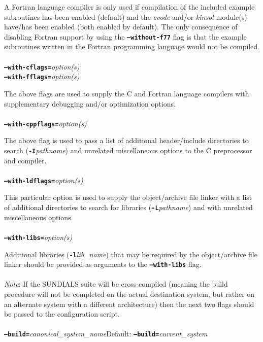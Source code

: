 \documentclass[10pt]{report}
\begin{document}
A Fortran language compiler is only used if compilation of the included example subroutines has been enabled (default) and the \textit{cvode} and/or \textit{kinsol} module(s) have/has been enabled (both enabled by default).   The only consequence of disabling Fortran support by using the \texttt{\textbf{--without-f77}} flag is that the example subroutines written in the Fortran programming language would not be compiled.
\\
\\
\texttt{\textbf{--with-cflags=}}\textit{option(s)}\\
\texttt{\textbf{--with-fflags=}}\textit{option(s)}\vspace{0.05in}

The above flags are used to supply the C and Fortran language compilers with supplementary debugging and/or optimization options.
\\
\\
\texttt{\textbf{--with-cppflags=}}\textit{option(s)}\vspace{0.05in}

The above flag is used to pass a list of additional header/include directories to search (\texttt{\textbf{-I}}\textit{pathname}) and unrelated miscellaneous options to the C preprocessor and compiler. 
\\
\\
\texttt{\textbf{--with-ldflags=}}\textit{option(s)}\vspace{0.05in}

This particular option is used to supply the object/archive file linker with a list of additional directories to search for libraries (\texttt{\textbf{-L}}\textit{pathname}) and with unrelated miscellaneous options.
\\
\\
\texttt{\textbf{--with-libs=}}\textit{option(s)}\vspace{0.05in}

Additional libraries (\texttt{\textbf{-l}}\textit{lib\_name}) that may be required by the object/archive file linker should be provided as arguments to the \texttt{\textbf{--with-libs}} flag.
\\
\\ \enlargethispage*{1ex}
\textit{Note}: If the \small SUNDIALS \normalsize suite will be cross-compiled (meaning the build procedure will not be completed on the actual destination system, but rather on an alternate system with a different architecture) then the next two flags should be passed to the configuration script.
\\
\\
\texttt{\textbf{--build=}}\textit{canonical\_system\_name}\hspace{0.5in}Default: \texttt{\textbf{--build=}}\textit{current\_system}\vspace{0.05in}
\end{document}
